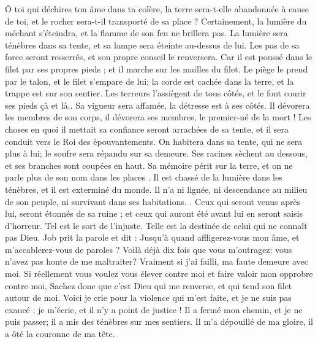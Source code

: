 \begin{multicols}{2}
Ô toi qui déchires ton âme dans ta colère, la terre sera-t-elle abandonnée à cause de toi, et le rocher sera-t-il transporté de sa place ? 
Certainement, la lumière du méchant s'éteindra, et la flamme de son feu ne brillera pas.
La lumière sera ténèbres dans sa tente, et sa lampe sera éteinte au-dessus de lui. 
Les pas de sa force seront resserrés, et son propre conseil le renversera.
Car il est poussé dans le filet par ses propres pieds ; et il marche sur les mailles du filet.
Le piège le prend par le talon, et le filet s'empare de lui;
la corde est cachée dans la terre, et la trappe est sur son sentier.
Les terreurs l'assiègent de tous côtés, et le font courir ses pieds çà et là..
Sa vigueur sera affamée, la détresse est à ses côtés.
Il dévorera les membres de son corps, il dévorera ses membres, le premier-né de la mort ! 
 Les choses en quoi il mettait sa confiance seront arrachées de sa tente, et il sera conduit vers le Roi des épouvantements. 
On habitera dans sa tente, qui ne sera plus à lui; le soufre sera répandu sur sa demeure. 
Ses racines sèchent au dessous, et ses branches sont coupées en haut. 
Sa mémoire périt sur la terre, et on ne parle plus de son nom dans les places .
Il est chassé de la lumière dans les ténèbres, et il est exterminé du monde. 
Il n'a ni lignée, ni descendance au milieu de son peuple, ni survivant dans ses habitations. . 
Ceux qui seront venus après lui, seront étonnés de sa ruine ; et ceux qui auront été avant lui en seront saisis d'horreur. 
Tel est le sort de l'injuste. Telle est la destinée de celui qui ne connaît pas Dieu. 
\VerseOne{}Job prit la parole et dit :
Jusqu'à quand affligerez-vous mon âme, et m'accablerez-vous de paroles ?
 Voilà déjà dix fois que vous m'outragez: vous n'avez pas honte de me maltraiter? 
Vraiment si j'ai failli, ma faute demeure avec moi. 
Si réellement vous voulez vous élever contre moi et faire valoir mon opprobre contre moi, 
Sachez donc que c'est Dieu qui me renverse, et qui tend son filet autour de moi.
Voici je crie pour la violence qui m'est faite, et je ne suis pas exaucé ; je m'écrie, et il n'y a point de justice !
Il a fermé mon chemin, et je ne puis passer; il a mis des ténèbres sur mes sentiers. 
Il m'a dépouillé de ma gloire, il a ôté la couronne de ma tête.

\end{multicols}
